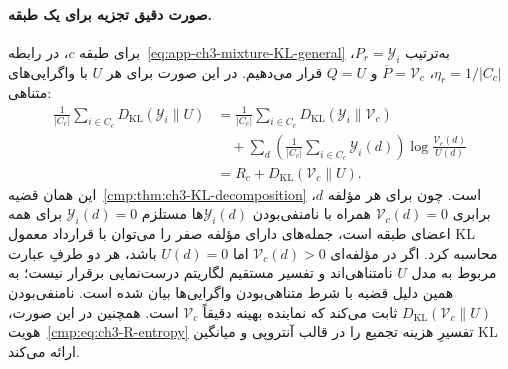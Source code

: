 \paragraph{صورت دقیق تجزیه برای یک طبقه.}
برای طبقه $c$، در رابطه~\eqref{eq:app-ch3-mixture-KL-general} به‌ترتیب $P_r=\mathscr Y_i$، $\eta_r=1/|C_c|$، $\overline P=\mathcal V_c$ و $Q=U$ قرار می‌دهیم. در این صورت برای هر $U$ با واگرایی‌های متناهی:
\begin{equation}\label{eq:ch3-KL-proof}
\begin{aligned}
\frac1{|C_c|}\sum_{i\in C_c}
D_{\mathrm{KL}}(\mathscr Y_i\|U)
&=\frac1{|C_c|}\sum_{i\in C_c}
D_{\mathrm{KL}}(\mathscr Y_i\|\mathcal V_c)\\
&\quad+\sum_d
\left(\frac1{|C_c|}\sum_{i\in C_c}\mathscr Y_i(d)\right)
\log\frac{\mathcal V_c(d)}{U(d)}\\
&=R_c+D_{\mathrm{KL}}(\mathcal V_c\|U).
\end{aligned}
\end{equation}
این همان قضیه~\ref{cmp:thm:ch3-KL-decomposition} است. چون برای هر مؤلفه $d$، برابری $\mathcal V_c(d)=0$ همراه با نامنفی‌بودن $\mathscr Y_i(d)$ها مستلزم $\mathscr Y_i(d)=0$ برای همه اعضای طبقه است، جمله‌های دارای مؤلفه صفر را می‌توان با قرارداد معمول KL محاسبه کرد. اگر در مؤلفه‌ای $\mathcal V_c(d)>0$ اما $U(d)=0$ باشد، هر دو طرفِ عبارت مربوط به مدل $U$ نامتناهی‌اند و تفسیر مستقیم لگاریتم درست‌نمایی برقرار نیست؛ به همین دلیل قضیه با شرط متناهی‌بودن واگرایی‌ها بیان شده است. نامنفی‌بودن $D_{\mathrm{KL}}(\mathcal V_c\|U)$ ثابت می‌کند که نماینده بهینه دقیقاً $\mathcal V_c$ است. همچنین در این صورت، هویت~\eqref{cmp:eq:ch3-R-entropy} تفسیرِ هزینه تجمیع را در قالب آنتروپی و میانگین KL ارائه می‌کند.

